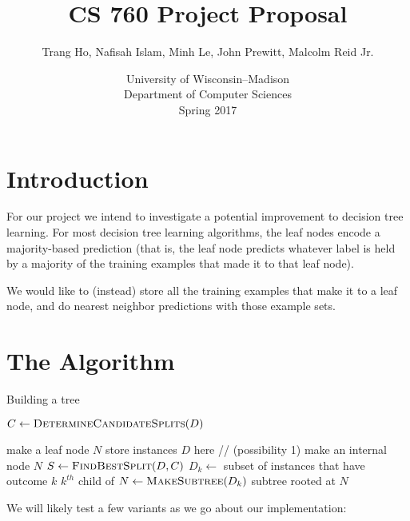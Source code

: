\documentclass[10pt]{article}
\title{CS 760 Project Proposal}
\author{Trang Ho, Nafisah Islam, Minh Le, John Prewitt, Malcolm Reid Jr.}
\date{University of Wisconsin--Madison\\Department of Computer Sciences\\Spring 2017}
\begin{document}
\setlength{\baselineskip}{18pt}
\maketitle

\section{Introduction}
For our project we intend to investigate a potential improvement to decision tree learning. For most decision tree learning algorithms, the leaf nodes encode a majority-based prediction (that is, the leaf node predicts whatever label is held by a majority of the training examples that made it to that leaf node).  

We would like to (instead) store all the training examples that make it to a leaf node, and do nearest neighbor predictions with those example sets.

\section{The Algorithm}
\begin{algorithm}
\caption{Building a tree}\label{euclid}
\begin{algorithmic}[1]

\State $C \gets \Call{DetermineCandidateSplits}{D}$

	\State make a leaf node $N$ 
	\State store instances $D$ here  // (possibility 1)
\Else
	\State make an internal node $N$ 
	\State $S \gets \Call{FindBestSplit}{D, C}$
		\State $D_k \gets$ subset of instances that have outcome $k$ 
		\State $k^{th}$ child of $N \gets \Call{MakeSubtree}{D_k}$
	\EndFor
\EndIf
\Return subtree rooted at $N$
\EndFunction
\end{algorithmic}
\end{algorithm}

We will likely test a few variants as we go about our implementation:
\end{document}
